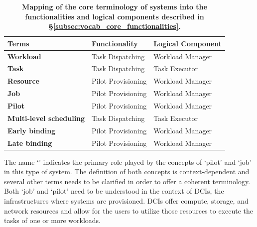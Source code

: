 \documentclass{sig-alternate}
\begin{document}
\begin{table}
 \centering
 \begin{tabular}{|l|l|l|}
  \hline
    \textbf{Terms} & \textbf{Functionality} & \textbf{Logical Component} \\
  \hline
  \hline
    \textbf{Workload} & Task Dispatching & Workload Manager \\
  \hline
    \textbf{Task} & Task Dispatching & Task Executor \\
  \hline
    \textbf{Resource} & Pilot Provisioning & Workload Manager \\
  \hline
    \textbf{Job} & Pilot Provisioning & Workload Manager \\
  \hline
    \textbf{Pilot} & Pilot Provisioning & Workload Manager \\
  \hline
    \textbf{Multi-level scheduling} & Task Dispatching & Task Executor \\
  \hline
    \textbf{Early binding} & Pilot Provisioning & Workload Manager \\
  \hline
    \textbf{Late binding} & Pilot Provisioning & Workload Manager \\
  \hline
 \end{tabular}
 \caption{\textbf{Mapping of the core terminology of \pilot systems into
  the functionalities and logical components described in
  \S\ref{subsec:vocab_core_functionalities}.}\up}
 \label{table:terminology}
\end{table}


The name `\pilotjob' indicates the primary role played by the concepts
of `pilot' and `job' in this type of system. The definition of both
concepts is context-dependent and several other terms needs to be
clarified in order to offer a coherent terminology. Both `job' and
`pilot' need to be understood in the context of DCIs, the
infrastructures where \pilotjobs systems are provisioned. DCIs offer
compute, storage, and network resources and \pilotjobs allow for the
users to utilize those resources to execute the tasks of one or more
workloads.

\end{document}
